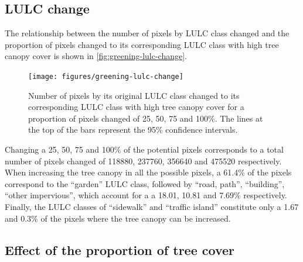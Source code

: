 \documentclass[10pt,letterpaper]{article}
\begin{document}
\subsection*{LULC change}

The relationship between the number of pixels by LULC class changed and the proportion of pixels changed to its corresponding LULC class with high tree canopy cover is shown in \autoref{fig:greening-lulc-change}.
\begin{figure}
  \centering
  \texttt{[image: figures/greening-lulc-change]} 
  \caption{\label{fig:greening-lulc-change} Number of pixels by its original LULC class changed to its corresponding LULC class with high tree canopy cover for a proportion of pixels changed of 25, 50, 75 and 100\%. The lines at the top of the bars represent the 95\% confidence intervals.}
\end{figure}
Changing a 25, 50, 75 and 100\% of the potential pixels corresponds to a total number of pixels changed of 118880, 237760, 356640 and 475520 respectively.
When increasing the tree canopy in all the possible pixels, a 61.4\% of the pixels correspond to the ``garden'' LULC class, followed by ``road, path'', ``building'', ``other impervious'', which account for a a 18.01, 10.81 and 7.69\% respectively. Finally, the LULC classes of ``sidewalk'' and ``traffic island'' constitute only a 1.67 and 0.3\% of the  pixels where the tree canopy can be increased.


\subsection*{Effect of the proportion of tree cover}
\end{document}
